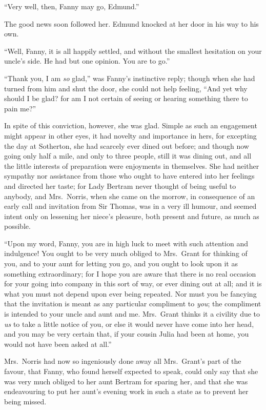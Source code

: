 \documentclass{article}
\begin{document}
``Very well, then, Fanny may go, Edmund.''

The good news soon followed her.  Edmund knocked at her
door in his way to his own.

``Well, Fanny, it is all happily settled, and without
the smallest hesitation on your uncle's side.
He had but one opinion.  You are to go.''

``Thank you, I am \emph{so} glad,'' was Fanny's instinctive reply;
though when she had turned from him and shut the door,
she could not help feeling, ``And yet why should I be glad?
for am I not certain of seeing or hearing something there
to pain me?''

In spite of this conviction, however, she was glad.
Simple as such an engagement might appear in other eyes,
it had novelty and importance in hers, for excepting the
day at Sotherton, she had scarcely ever dined out before;
and though now going only half a mile, and only to
three people, still it was dining out, and all the little
interests of preparation were enjoyments in themselves.
She had neither sympathy nor assistance from those who ought
to have entered into her feelings and directed her taste;
for Lady Bertram never thought of being useful to anybody,
and Mrs.\ Norris, when she came on the morrow, in consequence
of an early call and invitation from Sir Thomas, was in
a very ill humour, and seemed intent only on lessening
her niece's pleasure, both present and future, as much
as possible.

``Upon my word, Fanny, you are in high luck to meet
with such attention and indulgence!  You ought to be
very much obliged to Mrs.\ Grant for thinking of you,
and to your aunt for letting you go, and you ought to look
upon it as something extraordinary; for I hope you are
aware that there is no real occasion for your going into
company in this sort of way, or ever dining out at all;
and it is what you must not depend upon ever being repeated.
Nor must you be fancying that the invitation is meant
as any particular compliment to \emph{you}; the compliment
is intended to your uncle and aunt and me.  Mrs.\ Grant
thinks it a civility due to \emph{us} to take a little notice
of you, or else it would never have come into her head,
and you may be very certain that, if your cousin Julia
had been at home, you would not have been asked at all.''

Mrs.\ Norris had now so ingeniously done away all
Mrs.\ Grant's part of the favour, that Fanny, who found
herself expected to speak, could only say that she was
very much obliged to her aunt Bertram for sparing her,
and that she was endeavouring to put her aunt's evening
work in such a state as to prevent her being missed.
\end{document}
